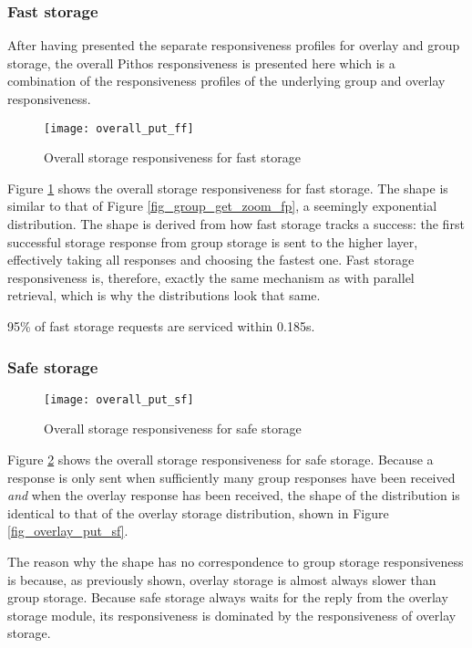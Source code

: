 \subsubsection{Fast storage}
After having presented the separate responsiveness profiles for overlay and group storage, the overall Pithos responsiveness is presented here which is a combination of the responsiveness profiles of the underlying group and overlay responsiveness.

\begin{figure}[htbp]
 \centering
 \texttt{[image: overall\_put\_ff]}
 \caption{Overall storage responsiveness for fast storage}
 \label{fig_overall_put_ff}
\end{figure}
%
Figure \ref{fig_overall_put_ff} shows the overall storage responsiveness for fast storage. The shape is similar to that of Figure \ref{fig_group_get_zoom_fp}, a seemingly exponential distribution. The shape is derived from how fast storage tracks a success: the first successful storage response from group storage is sent to the higher layer, effectively taking all responses and choosing the fastest one. Fast storage responsiveness is, therefore, exactly the same mechanism as with parallel retrieval, which is why the distributions look that same.

95\% of fast storage requests are serviced within 0.185s.

\subsubsection{Safe storage}
\begin{figure}[htbp]
 \centering
 \texttt{[image: overall\_put\_sf]}
 \caption{Overall storage responsiveness for safe storage}
 \label{fig_overall_put_sf}
\end{figure}
%
Figure \ref{fig_overall_put_sf} shows the overall storage responsiveness for safe storage. Because a response is only sent when sufficiently many group responses have been received \emph{and} when the overlay response has been received, the shape of the distribution is identical to that of the overlay storage distribution, shown in Figure \ref{fig_overlay_put_sf}.

The reason why the shape has no correspondence to group storage responsiveness is because, as previously shown, overlay storage is almost always slower than group storage. Because safe storage always waits for the reply from the overlay storage module, its responsiveness is dominated by the responsiveness of overlay storage.

